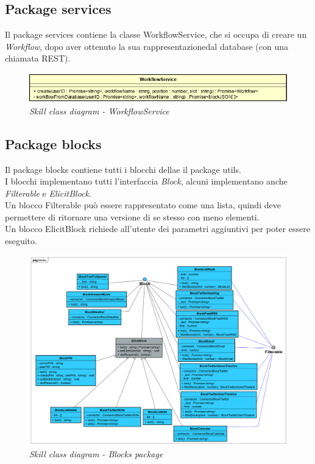 \subsection{Package services}
Il package services contiene la classe WorkflowService, che si occupa di creare un \textit{Workflow}, dopo aver ottenuto la sua rappresentazionedal database (con una chiamata REST).
\begin{figure} [H]
    \centering
	\includegraphics[scale=0.7]{./images/WorkflowService.PNG}
	\caption{\textit{Skill class diagram - WorkflowService}}\label{classlambda}
\end{figure}
\clearpage
\subsection{Package blocks}
Il package blocks contiene tutti i blocchi dellae il package utils.\\
I blocchi implementano tutti l'interfaccia \textit{Block}, alcuni implementano anche \textit{Filterable} e \textit{ElicitBlock}.\\
Un blocco Filterable può essere rappresentato come una lista, quindi deve permettere di ritornare una versione di se stesso con meno elementi.\\
Un blocco ElicitBlock richiede all'utente dei parametri aggiuntivi per poter essere eseguito.
\begin{figure} [H]
    \centering
	\includegraphics[scale=0.24]{./images/ZeroSevenClassBlocks.png}
	\caption{\textit{Skill class diagram - Blocks package}}\label{classlambda}
\end{figure}

